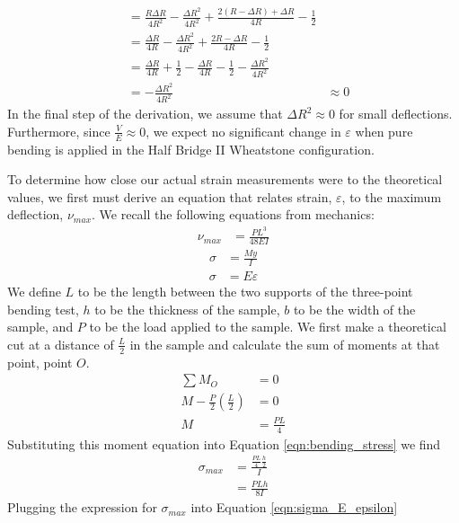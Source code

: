 \documentclass[12 pt]{report}
\begin{document}
\begin{parlist}
\begin{align*}
		&=\frac{R\Delta{}R}{4R^2}-\frac{\Delta{}R^2}{4R^2}+\frac{2(R-\Delta{}R)+\Delta{}R}{4R}-\frac{1}{2}\\
		&=\frac{\Delta{}R}{4R}-\frac{\Delta{}R^2}{4R^2}+\frac{2R-\Delta{}R}{4R}-\frac{1}{2}\\
		&=\frac{\Delta{}R}{4R}+\frac{1}{2}-\frac{\Delta{}R}{4R}-\frac{1}{2}-\frac{\Delta{}R^2}{4R^2}\\
		&=-\frac{\Delta{}R^2}{4R^2}
		&\approx0
	\end{align*}
	In the final step of the derivation, we assume that $\Delta{}R^2\approx0$ for small deflections. Furthermore, since $\frac{V}{E}\approx0$, we expect no significant change in $\varepsilon$ when pure bending is applied in the Half Bridge II Wheatstone configuration.
	
	\item To determine how close our actual strain measurements were to the theoretical values, we first must derive an equation that relates strain, $\varepsilon$, to the maximum deflection, $\nu_{max}$. We recall the following equations from mechanics:
	\begin{align} \label{eqn:nu_max}
		\nu_{max}&=\frac{PL^3}{48EI}
	\end{align}
	\begin{align} \label{eqn:bending_stress}
		\sigma&=\frac{My}{I}
	\end{align}
	\begin{align} \label{eqn:sigma_E_epsilon}
		\sigma&=E\varepsilon
	\end{align}
	We define $L$ to be the length between the two supports of the three-point bending test, $h$ to be the thickness of the sample, $b$ to be the width of the sample, and $P$ to be the load applied to the sample. We first make a theoretical cut at a distance of $\frac{L}{2}$ in the sample and calculate the sum of moments at that point, point $O$.
	\begin{align*}
		\sum{}M_O&=0\\
		M-\frac{P}{2}(\frac{L}{2})&=0\\
		M&=\frac{PL}{4}
	\end{align*}
	Substituting this moment equation into Equation \ref{eqn:bending_stress} we find
	\begin{align*}
		\sigma_{max}&=\frac{\frac{PL}{4}\frac{h}{2}}{I}\\
		&=\frac{PLh}{8I}
	\end{align*}
	Plugging the expression for $\sigma	_{max}$ into Equation \ref{eqn:sigma_E_epsilon}
	\begin{align*}

\end{align*}
\end{parlist}
\end{document}

